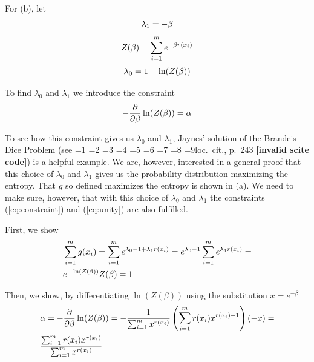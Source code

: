 \documentclass[12pt]{article}
\newif\ifNumericalOrYear
\newcommand{\PageP}{p.~}
\newcommand{\PageP}{}
\newcommand{\scite}[3]{\ifnum#1=1\ifNumericalOrYear\citep{#2}\else\citeyearpar{#2}\fi\else
\ifnum#1=2\ifNumericalOrYear\citep[#3]{#2}\else\citep[{\PageP}#3]{#2}\fi\else
\ifnum#1=3\ifNumericalOrYear(\citet[#3]{#2})\else\citep[{\PageP}#3]{#2}\fi\else
\ifnum#1=4\ifNumericalOrYear\citet{#2}\else\citet{#2}\fi\else
\ifnum#1=5\ifNumericalOrYear(\citet{#2})\else\citep{#2}\fi\else
\ifnum#1=6\ifNumericalOrYear(\citet[#3]{#2})\else\citep[{\PageP}#3]{#2}\fi\else
\ifnum#1=7\ifNumericalOrYear\citep{#2}\else\citealp{#2}\fi\else
\ifnum#1=8\ifNumericalOrYear\citep[#3]{#2}\else\citealp[{\PageP}#3]{#2}\fi\else
\ifnum#1=9\ifNumericalOrYear\citep[#3]{#2}\else{}loc.\ cit., {\PageP}#3\fi\else
\textbf{[invalid scite code]}\fi\fi\fi\fi\fi\fi\fi\fi\fi}
\begin{document}
For (b), let
\begin{equation}
  \label{eq:l1}
\lambda_{1}=-\beta\notag
\end{equation}
\begin{equation}
  \label{eq:zet}
Z(\beta)=\sum_{i=1}^{m}e^{-\beta{}r(x_{i})}\notag
\end{equation}
\begin{equation}
  \label{eq:l0}
\lambda_{0}=1-\ln(Z(\beta))\notag
\end{equation}

To find $\lambda_{0}$ and $\lambda_{1}$ we introduce the constraint
\begin{equation}
  \label{eq:logcon}
-\frac{\partial}{\partial{}\beta}\ln(Z(\beta))=\alpha\notag
\end{equation}

To see how this constraint gives us $\lambda_{0}$ and $\lambda_{1}$,
Jaynes' solution of the Brandeis Dice Problem (see
\scite{8}{jaynes89}{243}) is a helpful example. We are, however,
interested in a general proof that this choice of $\lambda_{0}$ and
$\lambda_{1}$ gives us the probability distribution maximizing the
entropy. That $g$ so defined maximizes the entropy is shown in (a). We
need to make sure, however, that with this choice of $\lambda_{0}$ and
$\lambda_{1}$ the constraints ({\ref{eq:constraint}}) and
({\ref{eq:unity}}) are also fulfilled.

First, we show
\begin{align}
&\sum_{i=1}^{m}g(x_{i})=\sum_{i=1}^{m}e^{\lambda_{0}-1+\lambda_{1}r(x_{i})}=e^{\lambda_{0}-1}\sum_{i=1}^{m}e^{\lambda_{1}r(x_{i})}=\notag\\
&e^{-\ln(Z(\beta))}Z(\beta)=1\label{eq:unishow}\notag
\end{align}

Then, we show, by differentiating $\ln(Z(\beta))$ using the
substitution $x=e^{-\beta}$
\begin{align}
&\alpha=-\frac{\partial}{\partial{}\beta}\ln(Z(\beta))=-\frac{1}{\sum_{i=1}^{m}x^{r(x_{i})}}\left(\sum_{i=1}^{m}r(x_{i})x^{r(x_{i})-1}\right)(-x)=\notag\\
&\frac{\sum_{i=1}^{m}r(x_{i})x^{r(x_{i})}}{\sum_{i=1}^{m}x^{r(x_{i})}}\notag
\end{align}
\end{document}
